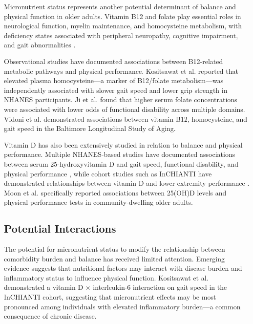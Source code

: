\documentclass[11pt,a4paper]{article}
\begin{document}
Micronutrient status represents another potential determinant of balance and physical function in older adults. Vitamin B12 and folate play essential roles in neurological function, myelin maintenance, and homocysteine metabolism, with deficiency states associated with peripheral neuropathy, cognitive impairment, and gait abnormalities \cite{vidoni2017_b12_hcy_gait, ng2012_b12_folate_function}.

Observational studies have documented associations between B12-related metabolic pathways and physical performance. Kositsawat et al. \cite{kositsawat2022_nhanes_hcy_function} reported that elevated plasma homocysteine—a marker of B12/folate metabolism—was independently associated with slower gait speed and lower grip strength in NHANES participants. Ji et al. \cite{ji2023_nhanes_folate_disability} found that higher serum folate concentrations were associated with lower odds of functional disability across multiple domains. Vidoni et al. \cite{vidoni2017_b12_hcy_gait} demonstrated associations between vitamin B12, homocysteine, and gait speed in the Baltimore Longitudinal Study of Aging.

Vitamin D has also been extensively studied in relation to balance and physical performance. Multiple NHANES-based studies have documented associations between serum 25-hydroxyvitamin D and gait speed, functional disability, and physical performance \cite{orces2019_nhanes_vitd_disability, kalenkoski2020_nhanes_vitd_gait}, while cohort studies such as InCHIANTI have demonstrated relationships between vitamin D and lower-extremity performance \cite{shardell2015_vitd_klotho_performance}. Moon et al. \cite{moon2019_vitd_performance} specifically reported associations between 25(OH)D levels and physical performance tests in community-dwelling older adults.

\subsection{Potential Interactions}

The potential for micronutrient status to modify the relationship between comorbidity burden and balance has received limited attention. Emerging evidence suggests that nutritional factors may interact with disease burden and inflammatory status to influence physical function. Kositsawat et al. \cite{kositsawat2019_vitd_il6_gait} demonstrated a vitamin D × interleukin-6 interaction on gait speed in the InCHIANTI cohort, suggesting that micronutrient effects may be most pronounced among individuals with elevated inflammatory burden—a common consequence of chronic disease.
\end{document}
